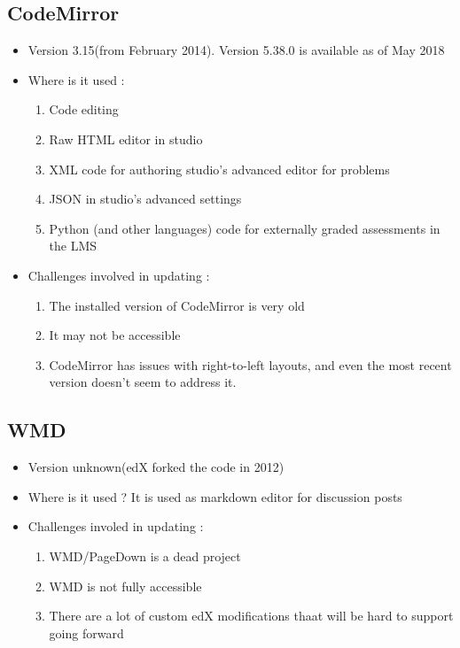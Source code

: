 \subsection{CodeMirror}
\begin{itemize}
	\item Version 3.15(from February 2014). Version 5.38.0 is available as of May 2018
	\item Where is it used :
		\begin{enumerate}
			\item Code editing
			\item Raw HTML editor in studio
			\item XML code for authoring studio's advanced editor for problems
			\item JSON in studio's advanced settings
			\item Python (and other languages) code for externally graded assessments in the LMS
		\end{enumerate}
	\item Challenges involved in updating :
		\begin{enumerate}
			\item The installed version of CodeMirror is very old
			\item It may not be accessible
			\item CodeMirror has issues with right-to-left layouts, and even the most recent version doesn't seem to address it.
		\end{enumerate}
\end{itemize}

\subsection{WMD}
\begin{itemize}
	\item Version unknown(edX forked the code in 2012)
	\item Where is it used ? It is used as markdown editor for discussion posts
	\item Challenges involed in updating :
		\begin{enumerate}
			\item WMD/PageDown is a dead project
			\item WMD is not fully accessible
			\item There are a lot of custom edX modifications thaat will be hard to support going forward
		\end{enumerate}
\end{itemize}

